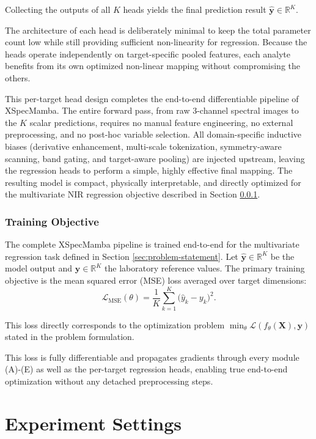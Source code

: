 \documentclass[pdflatex,sn-mathphys-num]{sn-jnl}%
\begin{document}
Collecting the outputs of all $K$ heads yields the final prediction result $\hat{\mathbf{y}} \in \mathbb{R}^{K}$.

The architecture of each head is deliberately minimal to keep the total parameter count low while still providing sufficient non-linearity for regression. Because the heads operate independently on target-specific pooled features, each analyte benefits from its own optimized non-linear mapping without compromising the others.

This per-target head design completes the end-to-end differentiable pipeline of XSpecMamba. The entire forward pass, from raw $3$-channel spectral images to the $K$ scalar predictions, requires no manual feature engineering, no external preprocessing, and no post-hoc variable selection. All domain-specific inductive biases (derivative enhancement, multi-scale tokenization, symmetry-aware scanning, band gating, and target-aware pooling) are injected upstream, leaving the regression heads to perform a simple, highly effective final mapping. The resulting model is compact, physically interpretable, and directly optimized for the multivariate NIR regression objective described in Section \ref{sec:training-objective}.

\subsubsection{Training Objective}\label{sec:training-objective}
The complete XSpecMamba pipeline is trained end-to-end for the multivariate regression task defined in Section \ref{sec:problem-statement}. Let $\hat{\mathbf{y}} \in \mathbb{R}^{K}$ be the model output and $\mathbf{y} \in \mathbb{R}^{K}$ the laboratory reference values. The primary training objective is the mean squared error (MSE) loss averaged over target dimensions:
\begin{equation}
    \mathcal{L}_{\text{MSE}}(\theta) = \frac{1}{K} \sum_{k=1}^{K} \bigl( \hat{y}_{k} - y_{k} \bigr)^2.
\end{equation}

This loss directly corresponds to the optimization problem $\min_{\theta} \mathcal{L}(f_{\theta}(\mathbf{X}), \mathbf{y})$ stated in the problem formulation.

This loss is fully differentiable and propagates gradients through every module (A)-(E) as well as the per-target regression heads, enabling true end-to-end optimization without any detached preprocessing steps.

\section{Experiment Settings}
\end{document}
